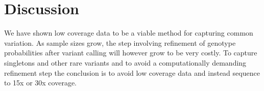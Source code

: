 \section{Discussion}

We have shown low coverage data to be a viable method for capturing common variation. As sample sizes grow, the step involving refinement of genotype probabilities after variant calling will however grow to be very costly. To capture singletons and other rare variants and to avoid a computationally demanding refinement step the conclusion is to avoid low coverage data and instead sequence to 15x or 30x coverage.